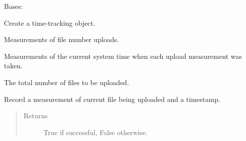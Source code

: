 \documentclass[letterpaper,10pt,english]{sphinxmanual}
\begin{document}
\begin{fulllineitems}
\label{\detokenize{src:src.timer.TimeIt}}
Bases: 

Create a time-tracking object.

\begin{fulllineitems}
\label{\detokenize{src:src.timer.TimeIt.upload_data}}
 \textendash{} Measurements of file number uploads.

\end{fulllineitems}


\begin{fulllineitems}
\label{\detokenize{src:src.timer.TimeIt.time_data}}
 \textendash{} Measurements of the current system time when
each upload measurement was taken.

\end{fulllineitems}


\begin{fulllineitems}
\label{\detokenize{src:src.timer.TimeIt.nfiles}}
 \textendash{} The total number of files to be uploaded.

\end{fulllineitems}


\begin{fulllineitems}
\label{\detokenize{src:src.timer.TimeIt.add_to_dataset}}
Record a measurement of current file being uploaded and a timestamp.
\begin{quote}\begin{description}
\item[{Returns}] \leavevmode
True if successful, False otherwise.

\end{description}\end{quote}

\end{fulllineitems}


\end{fulllineitems}
\end{document}
